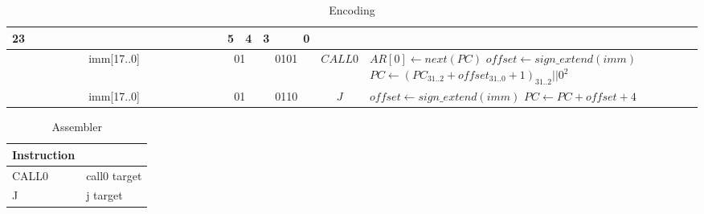	\begin{longtable}{llllllllllllllllllllllll  p{1cm}  p{7cm} | }
		\caption{Encoding\label{long}}\\
		23 & & & & & & & & & & & & & & & & & & 5 & 4 & 3 & & & 0 & &
		\multicolumn{1}{c}{}\\
		\hline
		\multicolumn{18}{|c|}{imm[17..0]} & \multicolumn{2}{c|}{01} & \multicolumn{4}{c|}{0101} & \multicolumn{1}{c|}{$CALL0$} & $AR[0] \leftarrow next(PC)$ \newline $offset \leftarrow sign\_extend(imm)$ \newline $PC \leftarrow (PC_{31..2}+offset_{31..0}+1)_{31..2}||0^2$\\ \hline
		\multicolumn{18}{|c|}{imm[17..0]} & \multicolumn{2}{c|}{01} & \multicolumn{4}{c|}{0110} & \multicolumn{1}{c|}{$J$} & $offset \leftarrow sign\_extend(imm)$ \newline $PC \leftarrow PC + offset + 4$\\ \hline
	\end{longtable}

	\begin{longtable}{|p{5cm}|p{5cm}|}
		\caption{Assembler\label{long}}\\
		\hline
		Instruction & \\
		\hline
		CALL0 & call0 target\\ \hline
		J & j target\\ \hline
	\end{longtable}
